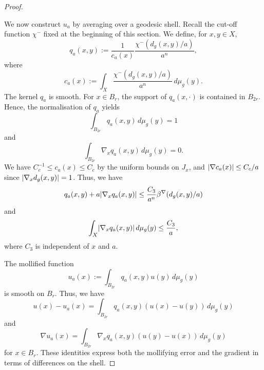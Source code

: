 \documentclass[a4paper,oneside,12pt]{amsart}
\theoremstyle{plain}
\theoremstyle{definition}
\theoremstyle{remark}
\DeclarePairedDelimiter{\abs}{\lvert}{\rvert}
\newcommand{\dvol}{d\mu}
\newcommand{\cutoff}{\beta}
\newcommand{\cutoffnabla}{\cutoff^{\nabla}}
\newcommand{\cutofflower}{\chi^-}
\begin{document}
\begin{proof}
\begin{figure}[htbp]
  \end{figure}

  We now construct $u_a$ by averaging over a geodesic shell.
  Recall the cut-off function $\cutofflower$ fixed at the beginning of this section.
  We define, for $x,y \in X$,
  \begin{equation}
    q_a(x,y) := \frac{1}{c_a(x)} \frac{\cutofflower(d_g(x,y)/a)}{a^n},
  \end{equation}
  where
  \begin{equation}
    c_a(x) := \int_X \frac{\cutofflower(d_g(x,y)/a)}{a^n} \,\dvol_g(y).
  \end{equation}
  The kernel $q_a$ is smooth.
  For $x \in B_r$, the support of $q_a(x,\cdot)$ is contained in $B_{2r}$.
  Hence, the normalisation of $q_a$ yields
  \begin{equation}
    \int_{B_{2r}} q_a(x,y) \,\dvol_g(y) = 1
  \end{equation}
  and
  \begin{equation}
    \int_{B_{2r}} \nabla_x q_a(x,y) \,\dvol_g(y) = 0.
  \end{equation}
  We have $C_c^{-1} \le c_a(x) \le C_c$ by the uniform bounds on $J_x$, and $\abs{\nabla c_a(x)} \le C_c/a$ since $\abs{\nabla_x d_g(x,y)} = 1$.
  Thus, we have
  \begin{equation}\label{inequality: mollified qa estimate}
    q_a(x,y) + a\abs{\nabla_x q_a(x,y)} \le \frac{C_3}{a^n}\cutoffnabla(d_g(x,y)/a)
  \end{equation}
  and
  \begin{equation}
    \int_X \abs{\nabla_x q_a(x,y)} \,\dvol_g(y) \le \frac{C_3}{a},
  \end{equation}
  where $C_3$ is independent of $x$ and $a$.

  The mollified function
  \begin{equation}
    u_a(x) := \int_{B_{2r}} q_a(x,y)u(y) \,\dvol_g(y)
  \end{equation}
  is smooth on $B_r$.
  Thus, we have
  \begin{equation}
      u(x)-u_a(x) = \int_{B_{2r}} q_a(x,y) (u(x)-u(y)) \,\dvol_g(y)
  \end{equation}
  and
  \begin{equation}
      \nabla u_a(x) = \int_{B_{2r}} \nabla_x q_a(x,y) (u(y)-u(x)) \,\dvol_g(y)
  \end{equation}
  for $x \in B_r$.
  These identities express both the mollifying error and the gradient in terms of differences on the shell.


\end{proof}
\end{document}
